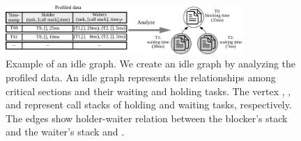 \begin{figure}[!t]
\centering
\includegraphics[width=0.80\textwidth]{fig/idleprofiler-idlegraph}
\caption{Example of an idle graph. We create an idle graph by
  analyzing the profiled data. An idle graph represents the relationships
  among critical sections and their waiting and holding tasks.
  The vertex , , and  represent call stacks of
  holding and waiting tasks, respectively. The edges show
  holder-waiter relation between the blocker's stack  and the
  waiter's stack  and .}
\label{f:idleprofiler-idlegraph}
\vspace{-5px}
\end{figure}

